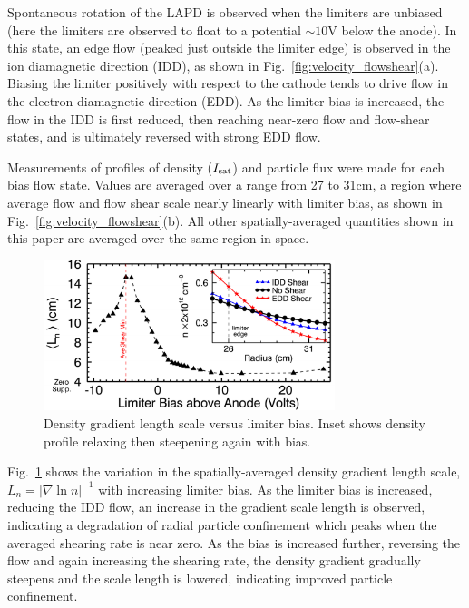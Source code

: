 \documentclass[aps,prl,amsmath,amssymb,preprint,superscriptaddress]{revtex4}
\begin{document}
Spontaneous rotation of the LAPD is observed when the limiters are
unbiased (here the limiters are observed to float to a
potential $\sim 10$V below the anode).  In this state, an edge flow
(peaked just outside the limiter edge) is
observed in the ion diamagnetic direction (IDD), as shown in
Fig.~\ref{fig:velocity_flowshear}(a).  Biasing the limiter positively
with respect to the cathode tends to drive flow in the electron
diamagnetic direction (EDD).  As the limiter bias is increased, the
flow in the IDD is first reduced, then reaching near-zero flow
and flow-shear states, and is ultimately reversed with strong EDD flow.

Measurements of profiles of density ($I_{\rm sat}$) and particle flux
were made for each bias flow state. Values are averaged over a range
from 27 to 31cm, a region where average flow and flow shear scale
nearly linearly with limiter bias, as shown in
Fig.~\ref{fig:velocity_flowshear}(b).  All other spatially-averaged
quantities shown in this paper are averaged over the same region in space.

\begin{figure}[!htbp]
\centerline{
\includegraphics[width=8.5cm]{densgrad.pdf}}
\caption{\label{fig:densgrad} Density gradient length scale versus limiter bias. Inset shows density profile relaxing then steepening again with bias.}
\end{figure}

Fig.~\ref{fig:densgrad} shows the variation in the spatially-averaged density gradient length scale, $L_{n} = \lvert \nabla \ln n \rvert ^{-1}$ with
increasing limiter bias.  As the limiter bias is increased, reducing
the IDD flow, an increase in the gradient scale length is observed,
indicating a degradation of radial particle confinement which peaks
when the averaged shearing rate is near zero.  
As the bias is
increased further, reversing the flow and again increasing the
shearing rate, the density gradient gradually steepens and the
scale length is lowered, indicating improved particle confinement.  
\end{document}
